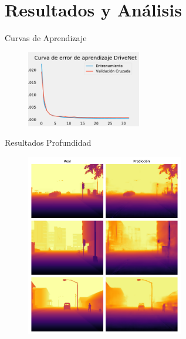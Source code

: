 \documentclass[10pt, usepdftitle=false]{beamer}
\begin{document}
\section[RESULTADOS Y ANÁLISIS]{Resultados y Análisis}

\begin{frame}[fragile]{Curvas de Aprendizaje}
	\begin{figure}[H]
		\captionsetup[subfloat]{labelformat=empty}
		\centering
		\hspace{2mm}
	\end{figure}

	\begin{figure}[H]
		\captionsetup{labelformat=empty}
		\centering
		\includegraphics[width=5cm]{imagenes/DriveNetCurve}
	\end{figure}
\end{frame}

\begin{frame}[fragile]{Resultados Profundidad}
	\begin{figure}[H]
		\captionsetup{labelformat=empty}
		\centering
		\includegraphics[height=8cm]{imagenes/preds/depth}
	\end{figure}
\end{frame}
\end{document}
